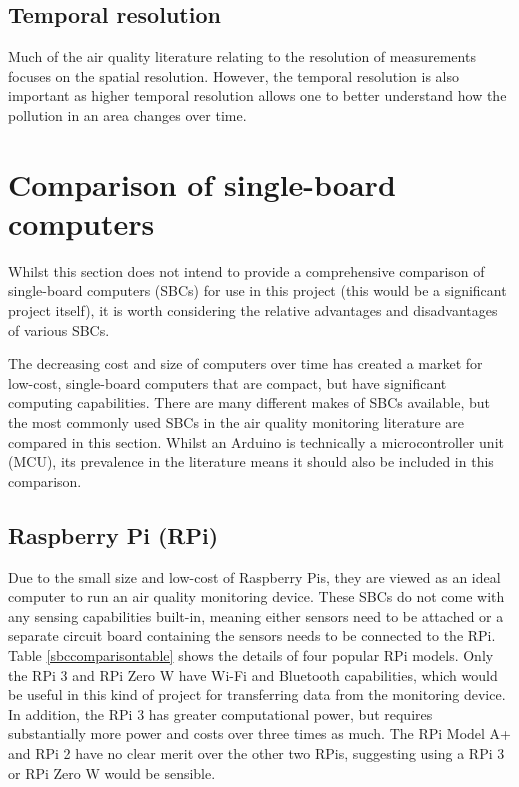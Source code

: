 \documentclass[11pt]{report}
\begin{document}
\subsection{Temporal resolution}

Much of the air quality literature relating to the resolution of measurements focuses on the spatial resolution. However, the temporal resolution is also important as higher temporal resolution allows one to better understand how the pollution in an area changes over time.


\section{Comparison of single-board computers}

Whilst this section does not intend to provide a comprehensive comparison of single-board computers (SBCs) for use in this project (this would be a significant project itself), it is worth considering the relative advantages and disadvantages of various SBCs.


The decreasing cost and size of computers over time has created a market for low-cost, single-board computers that are compact, but have significant computing capabilities. There are many different makes of SBCs available, but the most commonly used SBCs in the air quality monitoring literature are compared in this section. Whilst an Arduino is technically a microcontroller unit (MCU), its prevalence in the literature means it should also be included in this comparison.


\subsection{Raspberry Pi (RPi)}

Due to the small size and low-cost of Raspberry Pis, they are viewed as an ideal computer to run an air quality monitoring device. These SBCs do not come with any sensing capabilities built-in, meaning either sensors need to be attached or a separate circuit board containing the sensors needs to be connected to the RPi. Table \ref{sbccomparisontable} shows the details of four popular RPi models. Only the RPi 3 and RPi Zero W have Wi-Fi and Bluetooth capabilities, which would be useful in this kind of project for transferring data from the monitoring device. In addition, the RPi 3 has greater computational power, but requires substantially more power and costs over three times as much. The RPi Model A+ and RPi 2 have no clear merit over the other two RPis, suggesting using a RPi 3 or RPi Zero W would be sensible.
\end{document}
